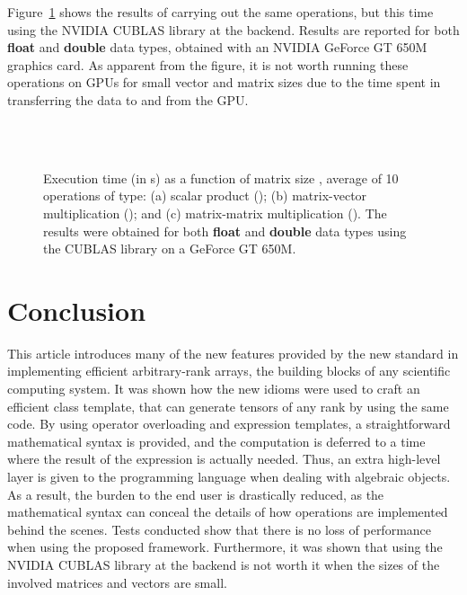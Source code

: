\documentclass[11pt]{article}
\def\ifmonospace{\ifdim\fontdimen3\font=0pt }
\def\C++{\ifmonospace C++\else C\kern-.1667em\raise.50ex\hbox{\tiny{\textbf{+}\kern-.1em\textbf{+}}}\fi \spacefactor1000 }
\newcommand{\code}[1]{{\footnotesize\ttfamily{#1}}}
\newcommand\keywordd[1]{{\color{DarkOrchid}\footnotesize\ttfamily\textbf{#1}}}
\begin{document}
Figure~\ref{fig:cublas_dgemm} shows the results of carrying out the same operations, but this time using the NVIDIA CUBLAS library at the backend. Results are reported for both \keywordd{float} and \keywordd{double} data types, obtained with an NVIDIA GeForce GT 650M graphics card. As apparent from the figure, it is not worth running these operations on GPUs for small vector and matrix sizes due to the time spent in transferring the data to and from the GPU.
\begin{figure}
 \centering 
         \\
         \\
  \caption{\label{fig:cublas_dgemm}Execution time  (in s) as a function of matrix size , average of 10 operations of type: (a)  scalar product (\code{dot}); (b) matrix-vector multiplication (\code{gemv}); and (c) matrix-matrix multiplication (\code{gemm}). The results were obtained for both \keywordd{float} and \keywordd{double} data types using the CUBLAS library on a GeForce GT 650M.}
\end{figure}



\section{Conclusion} \label{sec:conclusion}

This article introduces many of the new features provided by the new \C++ standard in implementing efficient arbitrary-rank arrays, the building blocks of any scientific computing system.
It was shown how the new idioms were used to craft an efficient \code{Array} class template, that can generate tensors of any rank by using the same code.
By using operator overloading and expression templates, a straightforward mathematical syntax is provided, and the computation is deferred to a time where the result of the expression is actually needed. Thus, an extra high-level layer is given to the \C++ programming language when dealing with algebraic objects. As a result, the burden to the end user is drastically reduced, as the mathematical syntax can conceal the details of how operations are implemented behind the scenes. Tests conducted show that there is no loss of performance when using the proposed framework. Furthermore, it was shown that using the NVIDIA CUBLAS library at the backend is not worth it when the sizes of the involved matrices and vectors are small.













\end{document}
